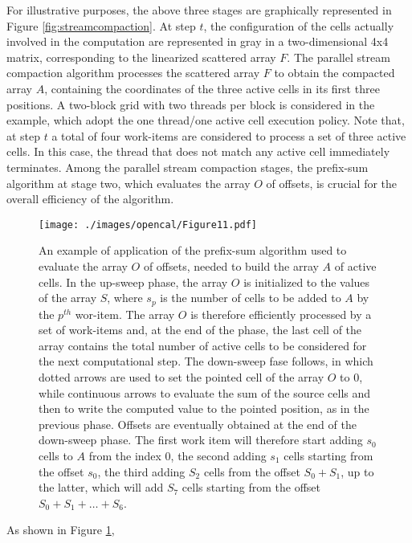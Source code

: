 For illustrative purposes, the above three stages are graphically
represented in Figure \ref{fig:streamcompaction}. At step $t$, the
configuration of the cells actually involved in the computation are
represented in gray in a two-dimensional 4x4 matrix, corresponding
to the linearized scattered array $F$. The parallel stream
compaction algorithm processes the scattered array $F$ to obtain the
compacted array $A$, containing the coordinates of the three active
cells in its first three positions. A two-block grid with two
threads per block is considered in the example, which adopt the one
thread/one active cell execution policy. Note that, at step $t$ a
total of four work-items are considered to process a set of three
active cells. In this case, the thread that does not match any
active cell immediately terminates. Among the parallel stream
compaction stages, the prefix-sum algorithm at stage two, which
evaluates the array $O$ of offsets, is crucial for the overall
efficiency of the algorithm. 
\begin{figure}
	\begin{center}
		\texttt{[image: ./images/opencal/Figure11.pdf]}
		\caption[An example of application of the prefix-sum algorithm used to build the array of \textit{active cells}.]{An example of application of the prefix-sum algorithm used to evaluate the array $O$ of offsets, needed to build the array $A$ of active cells. In the up-sweep phase, the array $O$ is initialized to the
		values of the array $S$, where $s_p$ is the number of cells to be
		added to $A$ by the $p^{th}$ wor-item. The array $O$ is therefore
		efficiently processed by a set of work-items and, at the end of the
		phase, the last cell of the array contains the total number of active cells to be considered for the next computational step. The down-sweep fase follows, in which dotted arrows are used to set the pointed cell of the array $O$ to 0, while continuous arrows to evaluate the sum of the source cells and then to write the computed value to the pointed position, as in the previous phase. Offsets are eventually obtained at the end of the down-sweep phase. The first work item will therefore start adding $s_0$ cells to $A$ from the index 0, the second adding $s_1$ cells starting from the offset $s_0$, the third adding $S_2$ cells from the offset $S_0+S_1$, up to the latter, which will add $S_7$ cells starting from the offset $S_0+S_1+\ldots+S_6$.}
		\label{fig:prefixsum}
	\end{center}
\end{figure}
As shown in Figure \ref{fig:prefixsum},
